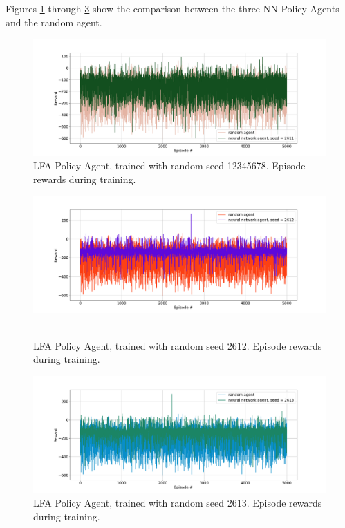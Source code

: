 \documentclass[11pt,a4paper]{article}
\begin{document}
\begin{enumerate}
Figures \ref{fig:5} through \ref{fig:7} show the comparison between the three NN Policy Agents and the random agent.
\begin{figure}
	\begin{center}
		\includegraphics[width = 20cm]{nn_2611.png}
		\caption{LFA Policy Agent, trained with random seed 12345678. Episode rewards during training.}
		\label{fig:5}
	\end{center}
	\end{figure}

	\begin{figure}
	\begin{center}
		\includegraphics[width = 20cm]{nn_2612.png}
		\
		\caption{LFA Policy Agent, trained with random seed 2612. Episode rewards during training.}
		\label{fig:6}
	\end{center}
	\end{figure}
	\begin{figure}
	\begin{center}
		\includegraphics[width = 20cm]{nn_2613.png}
		\caption{LFA Policy Agent, trained with random seed 2613. Episode rewards during training.}
		\label{fig:7}
	\end{center}
	\end{figure}
	

\end{enumerate}
\end{document}
